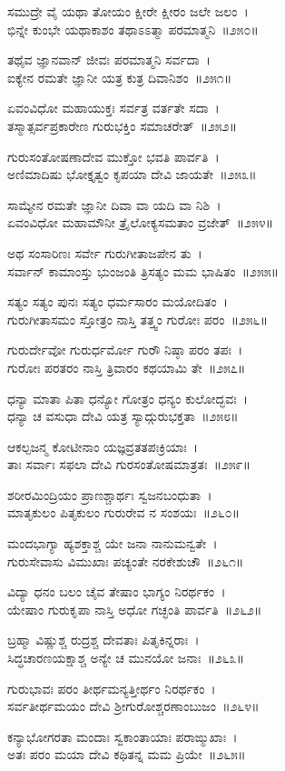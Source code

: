 ಸಮುದ್ರೇ ವೈ ಯಥಾ ತೋಯಂ ಕ್ಷೀರೇ ಕ್ಷೀರಂ ಜಲೇ ಜಲಂ~।\\
ಭಿನ್ನೇ ಕುಂಭೇ ಯಥಾಕಾಶಂ ತಥಾಽಽತ್ಮಾ ಪರಮಾತ್ಮನಿ~॥೨೫೦॥

ತಥೈವ ಜ್ಞಾನವಾನ್ ಜೀವಃ ಪರಮಾತ್ಮನಿ ಸರ್ವದಾ~।\\
ಐಕ್ಯೇನ ರಮತೇ ಜ್ಞಾನೀ ಯತ್ರ ಕುತ್ರ ದಿವಾನಿಶಂ~॥೨೫೧॥

ಏವಂವಿಧೋ ಮಹಾಯುಕ್ತಃ ಸರ್ವತ್ರ ವರ್ತತೇ ಸದಾ~।\\
ತಸ್ಮಾತ್ಸರ್ವಪ್ರಕಾರೇಣ ಗುರುಭಕ್ತಿಂ ಸಮಾಚರೇತ್~॥೨೫೨॥

ಗುರುಸಂತೋಷಣಾದೇವ ಮುಕ್ತೋ ಭವತಿ ಪಾರ್ವತಿ~।\\
ಅಣಿಮಾದಿಷು ಭೋಕ್ತೃತ್ವಂ ಕೃಪಯಾ ದೇವಿ ಜಾಯತೇ~॥೨೫೩॥

ಸಾಮ್ಯೇನ ರಮತೇ ಜ್ಞಾನೀ ದಿವಾ ವಾ ಯದಿ ವಾ ನಿಶಿ~।\\
ಏವಂವಿಧೋ ಮಹಾಮೌನೀ ತ್ರೈಲೋಕ್ಯಸಮತಾಂ ವ್ರಜೇತ್~॥೨೫೪॥

ಅಥ ಸಂಸಾರಿಣಃ ಸರ್ವೇ ಗುರುಗೀತಾಜಪೇನ ತು~।\\
ಸರ್ವಾನ್ ಕಾಮಾಂಸ್ತು ಭುಂಜಂತಿ ತ್ರಿಸತ್ಯಂ ಮಮ ಭಾಷಿತಂ~॥೨೫೫॥

ಸತ್ಯಂ ಸತ್ಯಂ ಪುನಃ ಸತ್ಯಂ ಧರ್ಮಸಾರಂ ಮಯೋದಿತಂ~।\\
ಗುರುಗೀತಾಸಮಂ ಸ್ತೋತ್ರಂ ನಾಸ್ತಿ ತತ್ತ್ವಂ ಗುರೋಃ ಪರಂ~॥೨೫೬॥

ಗುರುರ್ದೇವೋ ಗುರುರ್ಧರ್ಮೋ ಗುರೌ ನಿಷ್ಠಾ ಪರಂ ತಪಃ~।\\
ಗುರೋಃ ಪರತರಂ ನಾಸ್ತಿ ತ್ರಿವಾರಂ ಕಥಯಾಮಿ ತೇ~॥೨೫೭॥

ಧನ್ಯಾ ಮಾತಾ ಪಿತಾ ಧನ್ಯೋ ಗೋತ್ರಂ ಧನ್ಯಂ ಕುಲೋದ್ಭವಃ~।\\
ಧನ್ಯಾ ಚ ವಸುಧಾ ದೇವಿ ಯತ್ರ ಸ್ಯಾದ್ಗುರುಭಕ್ತತಾ~॥೨೫೮॥

ಆಕಲ್ಪಜನ್ಮ ಕೋಟೀನಾಂ ಯಜ್ಞವ್ರತತಪಃಕ್ರಿಯಾಃ~।\\
ತಾಃ ಸರ್ವಾಃ ಸಫಲಾ ದೇವಿ ಗುರಸಂತೋಷಮಾತ್ರತಃ~॥೨೫೯॥

ಶರೀರಮಿಂದ್ರಿಯಂ ಪ್ರಾಣಶ್ಚಾರ್ಥಃ ಸ್ವಜನಬಂಧುತಾ~।\\
ಮಾತೃಕುಲಂ ಪಿತೃಕುಲಂ ಗುರುರೇವ ನ ಸಂಶಯಃ~॥೨೬೦॥

ಮಂದಭಾಗ್ಯಾ ಹ್ಯಶಕ್ತಾಶ್ಚ ಯೇ ಜನಾ ನಾನುಮನ್ವತೇ~।\\
ಗುರುಸೇವಾಸು ವಿಮುಖಾಃ ಪಚ್ಯಂತೇ ನರಕೇಶುಚೌ~॥೨೬೧॥

ವಿದ್ಯಾ ಧನಂ ಬಲಂ ಚೈವ ತೇಷಾಂ ಭಾಗ್ಯಂ ನಿರರ್ಥಕಂ~।\\
ಯೇಷಾಂ ಗುರುಕೃಪಾ ನಾಸ್ತಿ ಅಧೋ ಗಚ್ಛಂತಿ ಪಾರ್ವತಿ~॥೨೬೨॥

ಬ್ರಹ್ಮಾ ವಿಷ್ಣುಶ್ಚ ರುದ್ರಶ್ಚ ದೇವತಾಃ ಪಿತೃಕಿನ್ನರಾಃ~।\\
ಸಿದ್ಧಚಾರಣಯಕ್ಷಾಶ್ಚ ಅನ್ಯೇ ಚ ಮುನಯೋ ಜನಾಃ~॥೨೬೩॥

ಗುರುಭಾವಃ ಪರಂ ತೀರ್ಥಮನ್ಯತ್ತೀರ್ಥಂ ನಿರರ್ಥಕಂ~।\\
ಸರ್ವತೀರ್ಥಮಯಂ ದೇವಿ ಶ್ರೀಗುರೋಶ್ಚರಣಾಂಬುಜಂ~॥೨೬೪॥

ಕನ್ಯಾಭೋಗರತಾ ಮಂದಾಃ ಸ್ವಕಾಂತಾಯಾಃ ಪರಾಙ್ಮುಖಾಃ~।\\
ಅತಃ ಪರಂ ಮಯಾ ದೇವಿ ಕಥಿತನ್ನ ಮಮ ಪ್ರಿಯೇ~॥೨೬೫॥

